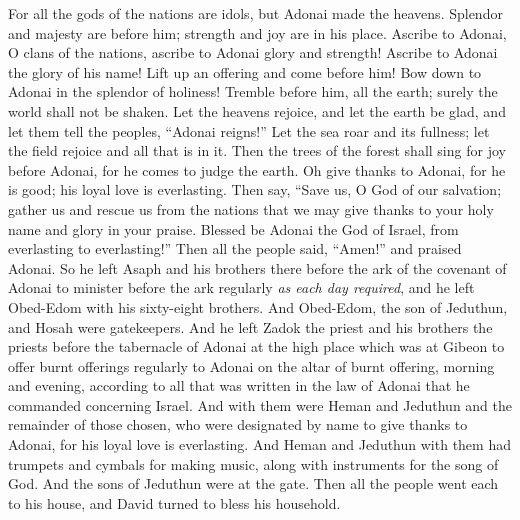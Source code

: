 \begin{biblechapter}
\verse For all the gods of the nations are idols, 
but Adonai made the heavens.
\verse Splendor and majesty are before him; 
strength and joy are in his place.
\verse Ascribe to Adonai, O clans of the nations, 
ascribe to Adonai glory and strength!
\verse Ascribe to Adonai the glory of his name! 
Lift up an offering and come before him! 
Bow down to Adonai in the splendor of holiness!
\verse Tremble before him, all the earth; 
surely the world shall not be shaken.
\verse Let the heavens rejoice, and let the earth be glad, 
and let them tell the peoples, “Adonai reigns!”
\verse Let the sea roar and its fullness; 
let the field rejoice and all that is in it.
\verse Then the trees of the forest shall sing for joy before Adonai, 
for he comes to judge the earth.
\verse Oh give thanks to Adonai, for he is good; 
his loyal love is everlasting.
\verse Then say, “Save us, O God of our salvation; 
gather us and rescue us from the nations 
that we may give thanks to your holy name 
and glory in your praise.
\verse Blessed be Adonai the God of Israel, 
from everlasting to everlasting!” Then all the people said, “Amen!” and praised Adonai.
 So he left Asaph and his brothers there before the ark of the covenant of Adonai to minister before the ark regularly \textit{as each day required},
\verse and he left Obed-Edom with his sixty-eight brothers. And Obed-Edom, the son of Jeduthun, and Hosah were gatekeepers.
\verse And he left Zadok the priest and his brothers the priests before the tabernacle of Adonai at the high place which was at Gibeon
\verse to offer burnt offerings regularly to Adonai on the altar of burnt offering, morning and evening, according to all that was written in the law of Adonai that he commanded concerning Israel.
\verse And with them were Heman and Jeduthun and the remainder of those chosen, who were designated by name to give thanks to Adonai, for his loyal love is everlasting.
\verse And Heman and Jeduthun with them had trumpets and cymbals for making music, along with instruments for the song of God. And the sons of Jeduthun were at the gate.
\verse Then all the people went each to his house, and David turned to bless his household.
\end{biblechapter}

